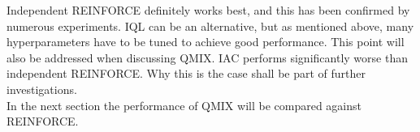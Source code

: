 Independent REINFORCE definitely works best, and this has been confirmed by numerous experiments. IQL can be an alternative, but as mentioned above, many hyperparameters have to be tuned to achieve good performance. This point will also be addressed when discussing QMIX. IAC performs significantly worse than independent REINFORCE. Why this is the case shall be part of further investigations.\\
In the next section the performance of QMIX will be compared against REINFORCE.

